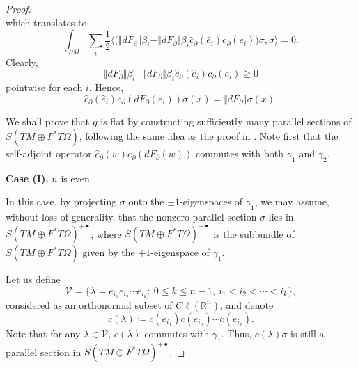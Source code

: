 \documentclass[12pt, reqno]{amsart}
\theoremstyle{plain} %
\theoremstyle{definition}
\theoremstyle{remark}
\numberwithin{equation}{section}
\newcommand{\dom}[1]{\hat{#1}}
\newcommand{\onorm}[1]{\Vert #1 \Vert}
\newcommand{\bnd}[1]{\partial #1}
\newcommand{\field}[1]{\mathbb{#1}}
\newcommand{\R}{\field{R}}
\newcommand{\inner}[1]{\langle #1 \rangle}
\newcommand{\Cl}{C\ell}
\begin{document}
\begin{proof}
\begin{equation*}
    \end{equation*}
    which translates to
    \begin{equation*}
        \int_{\bnd{M}} \sum_i \frac{1}{2} \inner{\big(\onorm{dF_\partial} \beta_i - \onorm{dF_\partial} \beta_i \dom{c}_\partial(\dom{e}_i) c_\partial(e_i)\big) \sigma, \sigma} = 0.
    \end{equation*}
    Clearly,
    \begin{equation*}
        \onorm{dF_\partial} \beta_i - \onorm{dF_\partial} \beta_i \dom{c}_\partial(\dom{e}_i) c_\partial(e_i) \geq 0
    \end{equation*}
    pointwise for each \(i\).
    Hence,
    \begin{equation*}
        \dom{c}_\partial(\dom{e}_i) c_\partial(dF_\partial(e_i)) \sigma(x) = \onorm{dF_\partial}\sigma(x).
    \end{equation*}
     
    We shall prove that $g$ is flat by constructing sufficiently many parallel sections of $S(TM\oplus F^*T\Omega)$, following the same idea as the proof in \cite{WangXieflat}.
    Note first that the self-adjoint operator $\hat c_\partial(w) c_\partial(dF_\partial(w))$ commutes with both $\gamma_1$ and $\gamma_2$.

    \textbf{Case (I).} $n$ is even.
    
    In this case, by projecting \(\sigma\) onto the \(\pm 1\)-eigenspaces of \(\gamma_1\), we may assume, without loss of generality, that the nonzero parallel section $\sigma$ lies in $S(TM\oplus F^*T\Omega)^{+\bullet}$, where $S(TM\oplus F^*T\Omega)^{+\bullet}$ is the subbundle of $S(TM\oplus F^*T\Omega)$ given by the $+1$-eigenspace of $\gamma_1$. 
    
    Let us define
   \begin{equation*}
        \mathscr V=\{\lambda=e_{i_1}e_{i_2}\cdots e_{i_k}:~0\leq k\leq n-1,~i_1<i_2<\cdots<i_k\},
    \end{equation*}
    considered as an orthonormal subset of $\Cl(\R^n)$, and denote
    $$c(\lambda)\coloneqq c(e_{i_1})c(e_{i_2})\cdots c(e_{i_k}).$$
    Note that for any $\lambda\in\mathscr V$, $c(\lambda)$ commutes with $\gamma_1$. Thus, $c(\lambda)\sigma$ is still a parallel section in $S(TM\oplus F^*T\Omega)^{+\bullet}$.
    

\end{proof}
\end{document}

